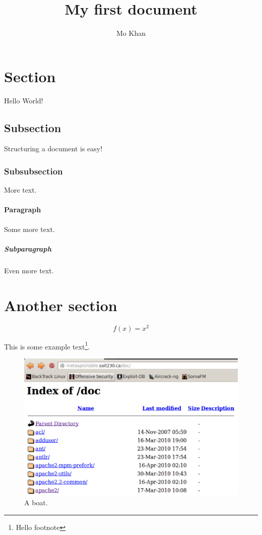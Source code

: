 \documentclass{article}
\title{My first document}
\author{Mo Khan}
\begin{document}
  \maketitle
  \newpage
  \tableofcontents
  \newpage

  \section{Section}

  Hello World!

  \subsection{Subsection}

  Structuring a document is easy!

  \subsubsection{Subsubsection}

  More text.

  \paragraph{Paragraph}

  Some more text.

  \subparagraph{Subparagraph}

  Even more text.

  \newpage
  \section{Another section}

  \begin{equation*}
    f(x) = x^2
  \end{equation*}

  This is some example text\footnote{\label{myfootnote}Hello footnote}.

  \begin{figure}[h!]
    \includegraphics[width=\linewidth]{images/screenshot.png}
    \caption{A boat.}
    \label{fig:boat1}
  \end{figure}
\end{document}
